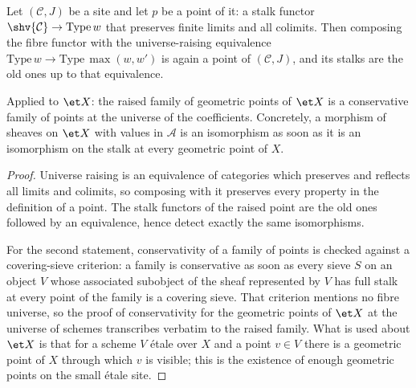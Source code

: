 \begin{lemma}
\label{lemma:openclosed-point-ulift}
\leanok
Let $(\mathcal C,J)$ be a site and let $p$ be a point of it: a stalk functor
$\shv{\mathcal C}\to\mathrm{Type}\,w$ that preserves finite limits and all
colimits.  Then composing the fibre functor with the universe-raising
equivalence $\mathrm{Type}\,w\to\mathrm{Type}\,\max(w,w')$ is again a point of
$(\mathcal C,J)$, and its stalks are the old ones up to that equivalence.

Applied to $\et X$: the raised family of geometric points of $\et X$ is a
conservative family of points at the universe of the coefficients.  Concretely,
a morphism of sheaves on $\et X$ with values in $\mathcal A$ is an
isomorphism as soon as it is an isomorphism on the stalk at every geometric
point of $X$.
\end{lemma}
\begin{proof}
\leanok
Universe raising is an equivalence of categories which preserves and reflects
all limits and colimits, so composing with it preserves every property in the
definition of a point.  The stalk functors of the raised point are the old
ones followed by an equivalence, hence detect exactly the same
isomorphisms.

For the second statement, conservativity of a family of points is checked
against a covering-sieve criterion: a family is conservative as soon as every
sieve $S$ on an object $V$ whose associated subobject of the sheaf represented
by $V$ has full stalk at every point of the family is a covering sieve.  That
criterion mentions no fibre universe, so the proof of
conservativity for the geometric points of $\et X$ at the universe of schemes
transcribes verbatim to the raised family.  What is used about $\et X$ is
that for a scheme $V$ \'etale over $X$ and a point $v\in V$ there is a
geometric point of $X$ through which $v$ is visible; this is the existence of
enough geometric points on the small \'etale site.
\end{proof}


